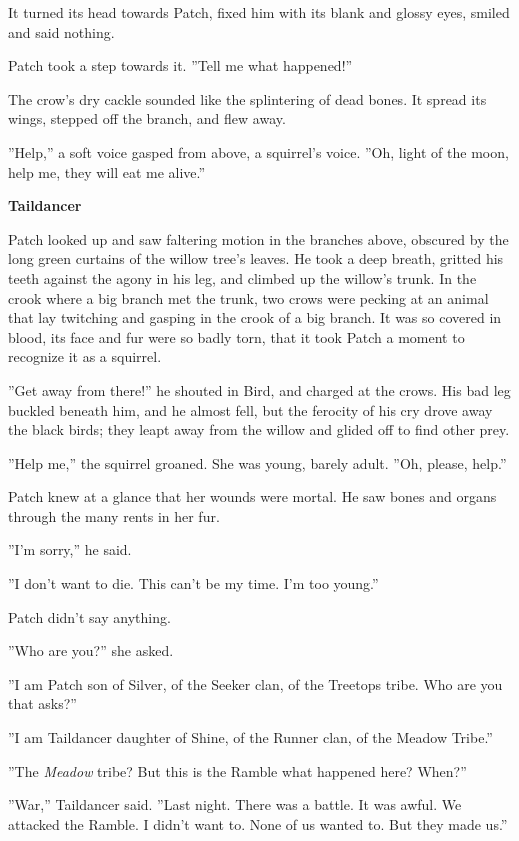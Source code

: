 \documentclass[11pt]{article}
\begin{document}
 It turned its head towards Patch, fixed him with its blank and glossy eyes, smiled and said nothing.\par
 Patch took a step towards it. ''Tell me what happened!''\par
 The crow's dry cackle sounded like the splintering of dead bones. It spread its wings, stepped off the branch, and flew away.\par
 ''Help,'' a soft voice gasped from above, a squirrel's voice. ''Oh, light of the moon, help me, they will eat me alive.''\par
\par
{\bf Taildancer\par
}\par
 Patch looked up and saw faltering motion in the branches above, obscured by the long green curtains of the willow tree's leaves. He took a deep breath, gritted his teeth against the agony in his leg, and climbed up the willow's trunk. In the crook where a big branch met the trunk, two crows were pecking at an animal that lay twitching and gasping in the crook of a big branch. It was so covered in blood, its face and fur were so badly torn, that it took Patch a moment to recognize it as a squirrel.\par
 ''Get away from there!'' he shouted in Bird, and charged at the crows. His bad leg buckled beneath him, and he almost fell, but the ferocity of his cry drove away the black birds; they leapt away from the willow and glided off to find other prey.\par
 ''Help me,'' the squirrel groaned. She was young, barely adult. ''Oh, please, help.''\par
 Patch knew at a glance that her wounds were mortal. He saw bones and organs through the many rents in her fur.\par
 ''I'm sorry,'' he said.\par
 ''I don't want to die. This can't be my time. I'm too young.''\par
 Patch didn't say anything.\par
 ''Who are you?'' she asked.\par
 ''I am Patch son of Silver, of the Seeker clan, of the Treetops tribe. Who are you that asks?''\par
 ''I am Taildancer daughter of Shine, of the Runner clan, of the Meadow Tribe.''\par
 ''The {\it Meadow} tribe? But this is the Ramble %
 what happened here? When?''\par
 ''War,'' Taildancer said. ''Last night. There was a battle. It was awful. We attacked the Ramble. I didn't want to. None of us wanted to. But they made us.''\par
\end{document}
